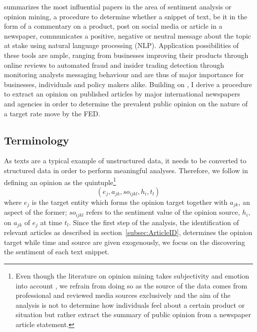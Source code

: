 
\textcite{Liu.2012} summarizes the most influential papers in the area of sentiment analysis or opinion mining, a procedure to determine whether a snippet of text, be it in the form of a commentary on a product, post on social media or article in a newspaper, communicates a positive, negative or neutral message about the topic at stake using natural language processing (NLP). Application possibilities of these tools are ample, ranging from businesses improving their products through online reviews to automated fraud and insider trading detection through monitoring analysts messaging behaviour and are thus of major importance for businesses, individuals and policy makers alike. 
Building on \textcite{Liu.2012,Feldman.2013,Silge.2017,Friedman.2001}, %
I derive a procedure to extract an opinion on published articles by major international newspapers and agencies in order to determine the prevalent public opinion on the nature of a target rate move by the FED.

\subsection{Terminology}

As texts are a typical example of unstructured data, it needs to be converted to structured data in order to perform meaningful analyses. Therefore, we follow \textcite{Liu.2010} in defining an opinion as the quintuple\footnote{Even though the literature on opinion mining takes subjectivity and emotion into account \parencite{Wiebe.2000,Wiebe.2004,Riloff.2006}, we refrain from doing so as the source of the data comes from professional and reviewed media sources exclusively and the aim of the analysis is not to determine how individuals feel about a certain product or situation but rather extract the summary of public opinion from a newspaper article statement.} 
\begin{equation}
	(e_j, a_{jk}, so_{ijkl}, h_i, t_l)
\end{equation}
where $e_j$ is the target entity which forms the opinion target together with $a_{jk}$, an aspect of the former; $so_{ijkl}$ refers to the sentiment value of the opinion source, $h_i$, on $a_{jk}$ of $e_j$ at time $t_l$. 
Since the first step of the analysis, the identification of relevant articles as described in section~\ref{subsec:ArticleID}, determines the opinion target while time and source are given exogenously, we focus on the discovering the sentiment of each text snippet. 


